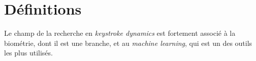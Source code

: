 \section{Définitions}

Le champ de la recherche en \textit{keystroke dynamics} est fortement associé à la biométrie, dont il est une branche, et au \textit{machine learning}, qui est un des outils les plus utilisés.




